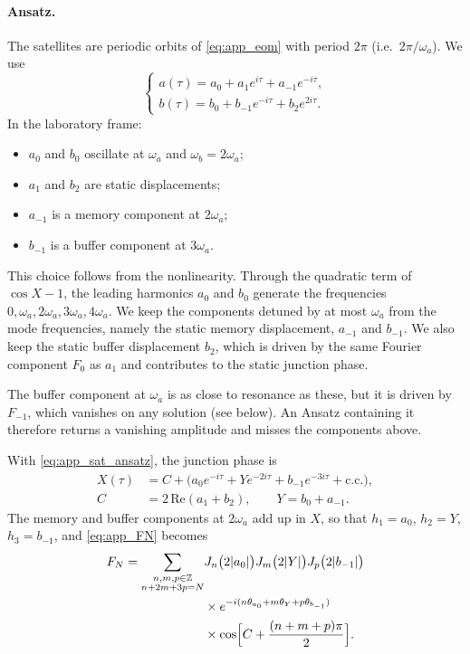 \documentclass[aps,prx,reprint,floatfix,amsmath,amssymb,longbibliography]{revtex4-2}
\begin{document}
\paragraph*{Ansatz.}
The satellites are periodic orbits of \cref{eq:app_eom} with period $2\pi$ (i.e.\ $2\pi/\omega_a$). We use
\begin{equation}
\begin{cases}
    a(\tau) = a_0 + a_1 e^{i\tau} + a_{-1}e^{-i\tau},\\
    b(\tau) = b_0 + b_{-1}e^{-i\tau} + b_2 e^{2i\tau}.
\end{cases}
\label{eq:app_sat_ansatz}
\end{equation}
In the laboratory frame:
\begin{itemize}
    \item $a_0$ and $b_0$ oscillate at $\omega_a$ and $\omega_b=2\omega_a$;
    \item $a_1$ and $b_2$ are static displacements;
    \item $a_{-1}$ is a memory component at $2\omega_a$;
    \item $b_{-1}$ is a buffer component at $3\omega_a$.
\end{itemize}

This choice follows from the nonlinearity. Through the quadratic term of $\cos X-1$, the leading harmonics $a_0$ and $b_0$ generate the frequencies $0,\omega_a,2\omega_a,3\omega_a,4\omega_a$. We keep the components detuned by at most $\omega_a$ from the mode frequencies, namely the static memory displacement, $a_{-1}$ and $b_{-1}$. We also keep the static buffer displacement $b_2$, which is driven by the same Fourier component $F_0$ as $a_1$ and contributes to the static junction phase.

The buffer component at $\omega_a$ is as close to resonance as these, but it is driven by $F_{-1}$, which vanishes on any solution (see below). An Ansatz containing it therefore returns a vanishing amplitude and misses the components above.

With \cref{eq:app_sat_ansatz}, the junction phase is
\begin{equation}
\begin{split}
    X(\tau) &= C + \bigl(a_0e^{-i\tau} + Y e^{-2i\tau} + b_{-1}e^{-3i\tau} + \text{c.c.}\bigr),\\
    C &= 2\,\mathrm{Re}(a_1+b_2),\qquad Y = b_0 + a_{-1}.
\end{split}
\end{equation}
The memory and buffer components at $2\omega_a$ add up in $X$, so that $h_1=a_0$, $h_2=Y$, $h_3=b_{-1}$, and \cref{eq:app_FN} becomes
\begin{equation}
\begin{split}
    F_N = \sum_{\substack{n,m,p\in\mathbb Z\\ n+2m+3p=N}}
    &J_n\bigl(2|a_0|\bigr)J_m\bigl(2|Y|\bigr)J_p\bigl(2|b_{-1}|\bigr)\\
    &\times e^{-i(n\theta_{a_0}+m\theta_{Y}+p\theta_{b_{-1}})}\\
    &\times\cos\Bigl[C+\frac{(n+m+p)\pi}{2}\Bigr].
\end{split}
\end{equation}
\end{document}
